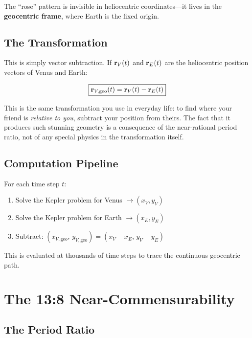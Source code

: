 \documentclass[11pt,letterpaper]{article}
\theoremstyle{definition}
\theoremstyle{plain}
\theoremstyle{remark}
\begin{document}
The ``rose'' pattern is invisible in heliocentric coordinates—it
lives in the \textbf{geocentric frame}, where Earth is the fixed
origin.

\subsection{The Transformation}

This is simply vector subtraction. If $\vb{r}_V(t)$ and
$\vb{r}_E(t)$ are the heliocentric position vectors of Venus
and Earth:

\begin{equation}
  \boxed{
    \vb{r}_{V,\text{geo}}(t)
    = \vb{r}_V(t) - \vb{r}_E(t)
  }
  \label{eq:geocentric}
\end{equation}

\begin{physicsintuition}
This is the same transformation you use in everyday life:
to find where your friend is \textit{relative to you},
subtract your position from theirs. The fact that it produces
such stunning geometry is a consequence of the near-rational
period ratio, not of any special physics in the transformation
itself.
\end{physicsintuition}

\subsection{Computation Pipeline}

For each time step $t$:
\begin{enumerate}[nosep]
  \item Solve the Kepler problem for Venus $\to (x_V, y_V)$
  \item Solve the Kepler problem for Earth $\to (x_E, y_E)$
  \item Subtract: $(x_{V,\text{geo}},\, y_{V,\text{geo}})
        = (x_V - x_E,\, y_V - y_E)$
\end{enumerate}

This is evaluated at thousands of time steps to trace the
continuous geocentric path.


\section{The 13:8 Near-Commensurability}
\label{sec:resonance}

\subsection{The Period Ratio}
\end{document}
